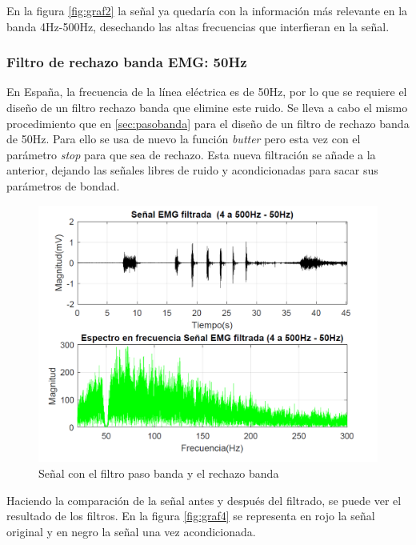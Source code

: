 En la figura \ref{fig:graf2} la señal ya quedaría con la información más relevante en la banda 4Hz-500Hz, desechando las altas frecuencias que interfieran en la señal. 

\subsubsection{Filtro de rechazo banda EMG: 50Hz}

En España, la frecuencia de la línea eléctrica es de 50Hz, por lo que se requiere el diseño de un filtro rechazo banda que elimine este ruido. Se lleva a cabo el mismo procedimiento que en \ref{sec:pasobanda} para el diseño de un filtro de rechazo banda de 50Hz. Para ello se usa de nuevo la función \textit{butter} pero esta vez con el parámetro \textit{stop} para que sea de rechazo. Esta nueva filtración se añade a la anterior, dejando las señales libres de ruido y acondicionadas para sacar sus parámetros de bondad.

\begin{figure}[H]
	\center
	\includegraphics[scale=0.5]{imagenes/Disenodelsistema/graf3.png}
	\caption{Señal con el filtro paso banda y el rechazo banda}
	\label{fig:graf3}
\end{figure}

Haciendo la comparación de la señal antes y después del filtrado, se puede ver el resultado de los filtros. En la figura \ref{fig:graf4} se representa en rojo la señal original y en negro la señal una vez acondicionada. 

